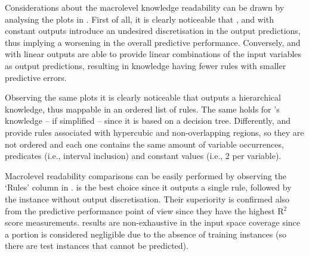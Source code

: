 \documentclass[sigconf]{acmart}
\begin{document}
Considerations about the macrolevel knowledge readability can be drawn by analysing the plots in .
%
First of all, it is clearly noticeable that \cart{}, \gridex{} and \creepy{} with constant outputs introduce an undesired discretisation in the output predictions, thus implying a worsening in the overall predictive performance.
%
Conversely, \gridrex{} and \creepy{} with linear outputs are able to provide linear combinations of the input variables as output predictions, resulting in knowledge having fewer rules with smaller predictive errors.

Observing the same plots it is clearly noticeable that \creepy{} outputs a hierarchical knowledge, thus mappable in an ordered list of rules.
%
The same holds for \cart{}'s knowledge -- if simplified -- since it is based on a decision tree.
%
Differently, \gridex{} and \gridex{} provide rules associated with hypercubic and non-overlapping regions, so they are not ordered and each one contains the same amount of variable occurrences, predicates (i.e., interval inclusion) and constant values (i.e., 2 per variable).

Macrolevel readability comparisons can be easily performed by observing the `Rules' column in .
%
\gridrex{} is the best choice since it outputs a single rule, followed by the \creepy{} instance without output discretisation.
%
Their superiority is confirmed also from the predictive performance point of view since they have the highest R$^2$ score measurements.
%
\gridrex{} results are non-exhaustive in the input space coverage since a portion is considered negligible due to the absence of training instances (so there are test instances that cannot be predicted).
\end{document}
